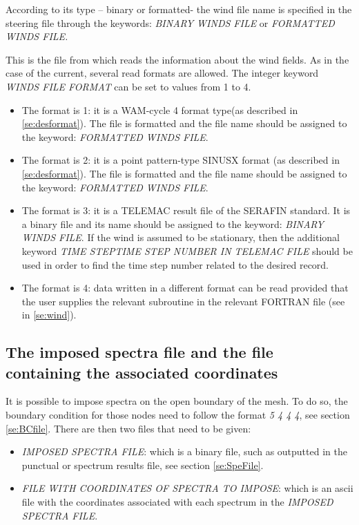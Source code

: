  According to its type -- binary or formatted- the wind file name is specified in the steering file through the keywords: \textit{BINARY WINDS FILE }or\textit{ FORMATTED WINDS FILE.}

 This is the file from which \tomawac reads the information about the wind fields. As in the case of the current, several read formats are allowed. The integer keyword \textit{WINDS FILE FORMAT} can be set to values from 1 to 4.

\begin{itemize}
\item  The format is 1: it is a WAM-cycle 4 format type(as described in \ref{se:desformat}). The file is formatted and the file name should be assigned to the keyword: \textit{FORMATTED WINDS FILE}.
\item  The format is 2: it is a point pattern-type SINUSX format (as described in  \ref{se:desformat}). The file is formatted and the file name should be assigned to the keyword: \textit{FORMATTED WINDS FILE}.
\item  The format is 3: it is a TELEMAC result file of the SERAFIN standard. It is a binary file and its name should be assigned to the keyword: \textit{BINARY WINDS FILE}. If the wind is assumed to be stationary, then the additional keyword \textit{TIME STEPTIME STEP NUMBER IN TELEMAC FILE }should be used in order to find the time step number related to the desired record.
\item  The format is 4: data written in a different format can be read provided that the user supplies the relevant subroutine in the relevant FORTRAN file (see in \ref{se:wind}).
\end{itemize}

\subsection{ The imposed spectra file and the file containing the associated coordinates}
\label{se:ImpSpeCoorFiles}

It is possible to impose spectra on the open boundary of the mesh. To do so, the boundary condition for those nodes
need to follow the format \textit{5 4 4 4}, see section \ref{se:BCfile}. There are then two files that need to be 
given:

\begin{itemize}
\item \textit{IMPOSED SPECTRA FILE}: which is a binary file, such as outputted in the punctual or spectrum
results file, see section \ref{se:SpeFile}.

\item \textit{FILE WITH COORDINATES OF SPECTRA TO IMPOSE}: which is an ascii file with the coordinates associated
with each spectrum in the \textit{IMPOSED SPECTRA FILE}.
\end{itemize}

